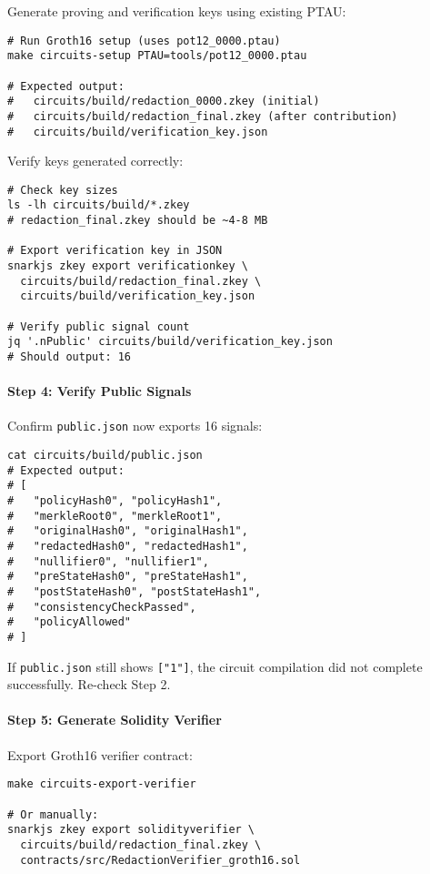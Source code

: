 Generate proving and verification keys using existing PTAU:

\begin{verbatim}
# Run Groth16 setup (uses pot12_0000.ptau)
make circuits-setup PTAU=tools/pot12_0000.ptau

# Expected output:
#   circuits/build/redaction_0000.zkey (initial)
#   circuits/build/redaction_final.zkey (after contribution)
#   circuits/build/verification_key.json
\end{verbatim}

Verify keys generated correctly:

\begin{verbatim}
# Check key sizes
ls -lh circuits/build/*.zkey
# redaction_final.zkey should be ~4-8 MB

# Export verification key in JSON
snarkjs zkey export verificationkey \
  circuits/build/redaction_final.zkey \
  circuits/build/verification_key.json

# Verify public signal count
jq '.nPublic' circuits/build/verification_key.json
# Should output: 16
\end{verbatim}

\paragraph{Step 4: Verify Public Signals}

Confirm \texttt{public.json} now exports 16 signals:

\begin{verbatim}
cat circuits/build/public.json
# Expected output:
# [
#   "policyHash0", "policyHash1",
#   "merkleRoot0", "merkleRoot1",
#   "originalHash0", "originalHash1",
#   "redactedHash0", "redactedHash1",
#   "nullifier0", "nullifier1",
#   "preStateHash0", "preStateHash1",
#   "postStateHash0", "postStateHash1",
#   "consistencyCheckPassed",
#   "policyAllowed"
# ]
\end{verbatim}

If \texttt{public.json} still shows \texttt{["1"]}, the circuit compilation did not complete successfully. Re-check Step 2.

\paragraph{Step 5: Generate Solidity Verifier}

Export Groth16 verifier contract:

\begin{verbatim}
make circuits-export-verifier

# Or manually:
snarkjs zkey export solidityverifier \
  circuits/build/redaction_final.zkey \
  contracts/src/RedactionVerifier_groth16.sol
\end{verbatim}

